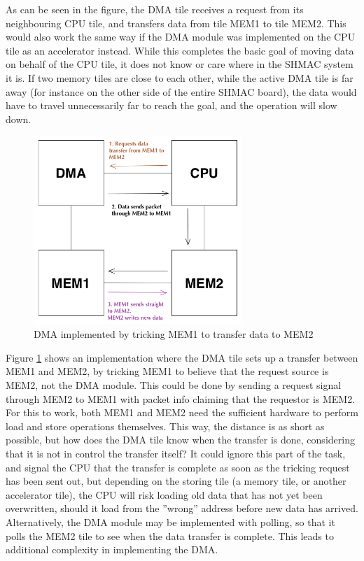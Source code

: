 As can be seen in the figure, the DMA tile receives a request from its neighbouring CPU tile, and transfers data from tile MEM1 to tile MEM2.
This would also work the same way if the DMA module was implemented on the CPU tile as an accelerator instead.
While this completes the basic goal of moving data on behalf of the CPU tile, it does not know or care where in the SHMAC system it is.
If two memory tiles are close to each other, while the active DMA tile is far away (for instance on the other side of the entire SHMAC board), the data would have to travel unnecessarily far to reach the goal, and the operation will slow down.

\begin{figure}[h!]
    \centering
    \includegraphics[width=0.7\textwidth]{Figures/DMA/DMASHMAC2}
    \caption{DMA implemented by tricking MEM1 to transfer data to MEM2}
    \label{fig:DMASHMAC2}
\end{figure}

Figure \ref{fig:DMASHMAC2} shows an implementation where the DMA tile sets up a transfer between MEM1 and MEM2, by tricking MEM1 to believe that the request source is MEM2, not the DMA module.
This could be done by sending a request signal through MEM2 to MEM1 with packet info claiming that the requestor is MEM2.
For this to work, both MEM1 and MEM2 need the sufficient hardware to perform load and store operations themselves.
This way, the distance is as short as possible, but how does the DMA tile know when the transfer is done, considering that it is not in control the transfer itself?
It could ignore this part of the task, and signal the CPU that the transfer is complete as soon as the tricking request has been sent out, but depending on the storing tile (a memory tile, or another accelerator tile), the CPU will risk loading old data that has not yet been overwritten, should it load from the ''wrong'' address before new data has arrived.
Alternatively, the DMA module may be implemented with polling, so that it polls the MEM2 tile to see when the data transfer is complete.
This leads to additional complexity in implementing the DMA.
 
